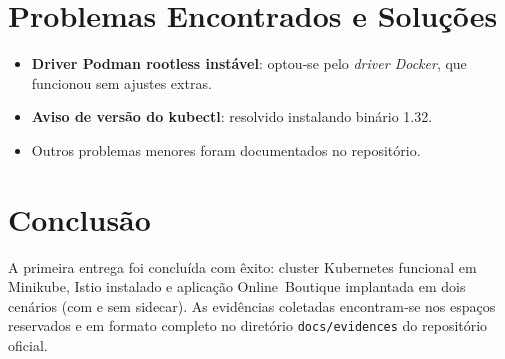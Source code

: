 \documentclass[12pt,a4paper]{report}
\begin{document}
\chapter{Problemas Encontrados e Soluções}
\begin{itemize}[leftmargin=*]
  \item \textbf{Driver Podman rootless instável}: optou‑se pelo \emph{driver Docker}, que funcionou sem ajustes extras.
  \item \textbf{Aviso de versão do kubectl}: resolvido instalando binário 1.32.
  \item Outros problemas menores foram documentados no repositório.
\end{itemize}

\chapter{Conclusão}
A primeira entrega foi concluída com êxito: cluster Kubernetes funcional em
Minikube, Istio instalado e aplicação Online Boutique implantada em dois
cenários (com e sem sidecar). As evidências coletadas encontram‑se nos espaços
reservados e em formato completo no diretório \texttt{docs/evidences} do
repositório oficial.


\end{document}
